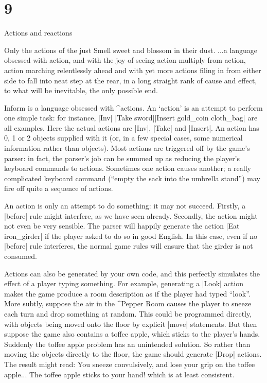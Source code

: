 \section{9}{Actions and reactions}

\widepoem
Only the actions of the just
Smell sweet and blossom in their dust.
\widequote
...a language obsessed with action, and with the joy of seeing
action multiply from action, action marching relentlessly ahead
and with yet more actions filing in from either side to fall into
neat step at the rear, in a long straight rank of cause and
effect, to what will be inevitable, the only possible end.

\noindent
Inform is a language obsessed with ^{actions}.  An `action' is an attempt
to perform one simple task: for instance,
\begindisplay
|Inv| \qquad |Take sword|\qquad |Insert gold_coin cloth_bag|
\enddisplay
are all examples.  Here the actual actions are |Inv|, |Take| and
|Insert|.  An action has 0, 1 or 2 objects supplied
with it (or, in a few special cases, some numerical information rather than
objects).  Most actions are triggered off by the game's parser: in fact,
the parser's job can be summed up as reducing the player's keyboard
commands to actions.  Sometimes one action causes another; a really
complicated keyboard command (``empty the sack into the umbrella stand'')
may fire off quite a sequence of actions.

An action is only an attempt to do something: it may not succeed.
Firstly, a |before| rule might interfere, as we have seen already.
Secondly, the action might not even be very sensible.  The parser will
happily generate the action |Eat iron_girder| if the player asked to do
so in good English.  In this case, even if no |before| rule interferes,
the normal game rules will ensure that the girder is not consumed.

Actions can also be generated by your own code, and this perfectly
simulates the effect of a player typing something.  For example,
generating a |Look| action makes the game produce a room description
as if the player had typed ``look''.  More subtly, suppose the air
in the ^{Pepper Room} causes the player to sneeze each turn and drop
something at random.  This could be programmed directly, with objects
being moved onto the floor by explicit |move| statements.  But then
suppose the game also contains a toffee apple, which sticks to the
player's hands.  Suddenly the toffee apple problem has an unintended
solution.  So rather than moving the objects directly to the floor,
the game should generate |Drop| actions.  The result might read:
\begindisplay
You sneeze convulsively, and lose your grip on the toffee apple...\cr
The toffee apple sticks to your hand!\cr
\enddisplay
which is at least consistent.

